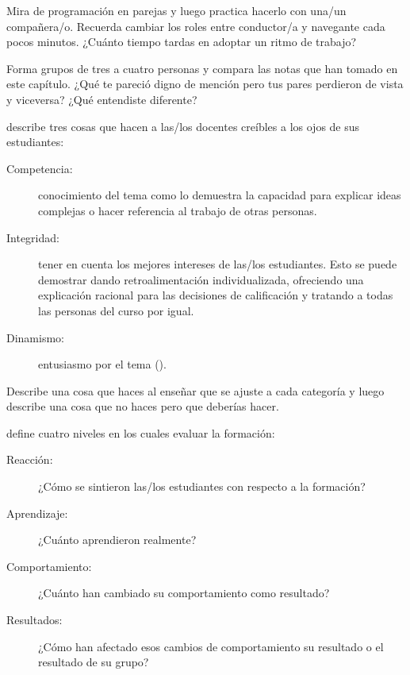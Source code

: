 
Mira  de programación en parejas
y luego practica hacerlo con una/un compañera/o.
Recuerda cambiar los roles entre conductor/a y navegante cada pocos minutos.
¿Cuánto tiempo tardas en adoptar un ritmo de trabajo?


Forma grupos de tres a cuatro personas
y compara las notas que han tomado en este capítulo.
¿Qué te pareció digno de mención pero tus pares perdieron de vista y viceversa?
¿Qué entendiste diferente?


\cite{Fink2013} describe tres cosas
que hacen a las/los docentes creíbles a los ojos de sus estudiantes:

\begin{description}

\item[Competencia:]
  conocimiento del tema
  como lo demuestra la capacidad para explicar ideas complejas
  o hacer referencia al trabajo de otras personas.
 
\item[Integridad:]
  tener en cuenta los mejores intereses de las/los estudiantes.
  Esto se puede demostrar dando retroalimentación individualizada,
  ofreciendo una explicación racional para las decisiones de calificación
  y tratando a todas las personas del curso por igual.

\item[Dinamismo:]
  entusiasmo por el tema ().

\end{description}

Describe una cosa que haces al enseñar que se ajuste a cada categoría
y luego describe una cosa que no haces pero que deberías hacer.


\cite{Kirk1994} define cuatro niveles en los cuales evaluar la formación:

\begin{description}

\item[Reacción:]
  ¿Cómo se sintieron las/los estudiantes con respecto a la formación?

\item[Aprendizaje:]
  ¿Cuánto aprendieron realmente?

\item[Comportamiento:]
  ¿Cuánto han cambiado su comportamiento como resultado?

\item[Resultados:]
  ¿Cómo han afectado esos cambios de comportamiento su resultado
  o el resultado de su grupo?

\end{description}

